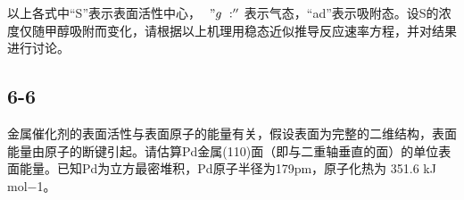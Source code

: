 以上各式中“S”表⽰表⾯活性中⼼， $\ " g \ : ^ { \prime \prime }$ 表⽰⽓态，“ad”表⽰吸附态。设S的浓度仅随甲醇吸附⽽变化，请根据以上机理⽤稳态近似推导反应速率⽅程，并对结果进⾏讨论。

\subsection*{6-6}
⾦属催化剂的表⾯活性与表⾯原⼦的能量有关，假设表⾯为完整的⼆维结构，表⾯能量由原⼦的断键引起。请估算Pd⾦属(110)⾯（即与⼆重轴垂直的⾯）的单位表⾯能量。已知Pd为⽴⽅最密堆积，Pd原⼦半径为179pm，原⼦化热为 351.6 kJ mol−1。

